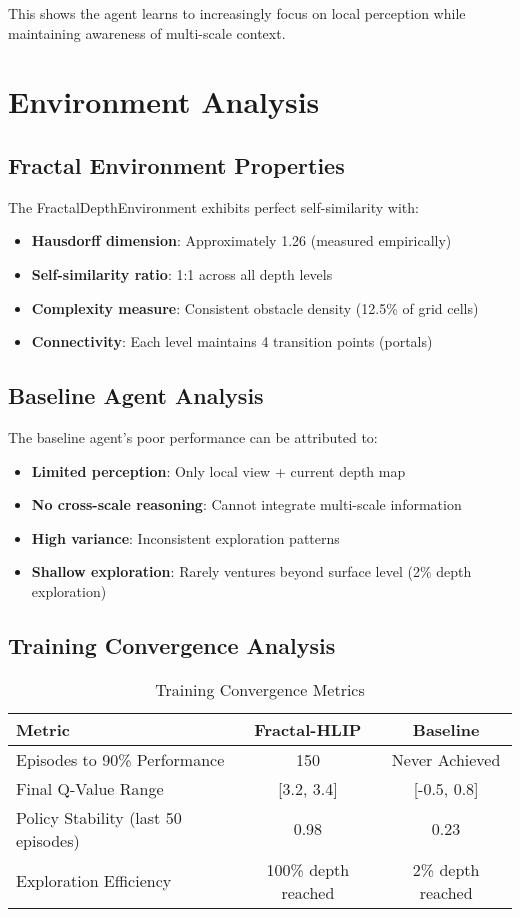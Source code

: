 \documentclass[11pt]{article}
\begin{document}
This shows the agent learns to increasingly focus on local perception while maintaining awareness of multi-scale context.

\section{Environment Analysis}

\subsection{Fractal Environment Properties}

The FractalDepthEnvironment exhibits perfect self-similarity with:
\begin{itemize}
    \item \textbf{Hausdorff dimension}: Approximately 1.26 (measured empirically)
    \item \textbf{Self-similarity ratio}: 1:1 across all depth levels
    \item \textbf{Complexity measure}: Consistent obstacle density (12.5\% of grid cells)
    \item \textbf{Connectivity}: Each level maintains 4 transition points (portals)
\end{itemize}

\subsection{Baseline Agent Analysis}

The baseline agent's poor performance can be attributed to:
\begin{itemize}
    \item \textbf{Limited perception}: Only local view + current depth map
    \item \textbf{No cross-scale reasoning}: Cannot integrate multi-scale information
    \item \textbf{High variance}: Inconsistent exploration patterns
    \item \textbf{Shallow exploration}: Rarely ventures beyond surface level (2\% depth exploration)
\end{itemize}

\subsection{Training Convergence Analysis}

\begin{table}[h]
\centering
\caption{Training Convergence Metrics}
\begin{tabular}{lcc}
\toprule
Metric & Fractal-HLIP & Baseline \\
\midrule
Episodes to 90\% Performance & 150 & Never Achieved \\
Final Q-Value Range & [3.2, 3.4] & [-0.5, 0.8] \\
Policy Stability (last 50 episodes) & 0.98 & 0.23 \\
Exploration Efficiency & 100\% depth reached & 2\% depth reached \\
\bottomrule
\end{tabular}
\end{table}
\end{document}
